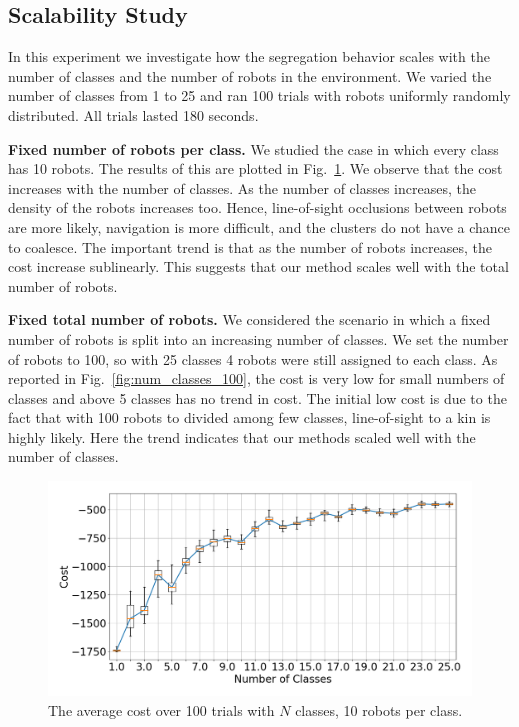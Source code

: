 \documentclass[letterpaper, 10 pt, conference]{ieeeconf}
\newcommand{\myparagraph}[1]{\textbf{#1.}}
\begin{document}
  \subsection{Scalability Study} \label{section:scalability}

  In this experiment we investigate how the segregation behavior scales with the
  number of classes and the number of robots in the environment. We varied the
  number of classes from 1 to 25 and ran 100 trials with robots uniformly randomly
  distributed. All trials lasted 180 seconds.

  \myparagraph{Fixed number of robots per class}
  We studied the case in which every class has 10 robots. The results of this are
  plotted in Fig.~\ref{fig:num_classes_10}. We observe that the cost increases
  with the number of classes. As the number of classes increases,
  the density of the robots increases too. Hence, line-of-sight occlusions between robots are more likely,
  navigation is more difficult, and the clusters do not have a chance to coalesce.
  The important trend is that as the number of robots increases, the cost increase sublinearly.
  This suggests that our method scales well with the total number of robots.

  \myparagraph{Fixed total number of robots}
  We considered the scenario in which a fixed number of robots is split into an
  increasing number of classes. We set the number of robots to 100, so with 25
  classes 4 robots were still assigned to each class. As reported in
  Fig.~\ref{fig:num_classes_100}, the cost is very low for small numbers of classes
  and above 5 classes has no trend in cost. The initial low cost is due to the fact that
  with 100 robots to divided among few classes, line-of-sight to a kin is highly likely.
  Here the trend indicates that our methods scaled well with the number of classes.

  \begin{figure}[t]
    \centering
    \includegraphics[width=1\linewidth]{./images/num_classes_vs_cost_10_per_class.png}
    \caption{The average cost over 100 trials with $N$ classes, 10 robots per class.}
    \label{fig:num_classes_10}
  \end{figure}
\end{document}
